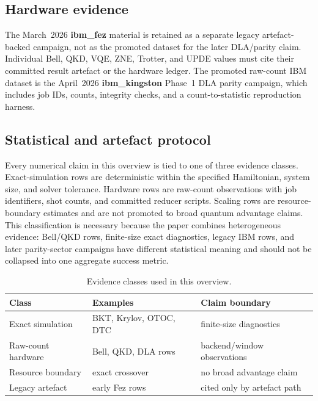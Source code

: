 \documentclass[twocolumn,prl,superscriptaddress,showpacs,floatfix]{revtex4-2}
\begin{document}
\subsection{Hardware evidence}

The March~2026 \textbf{ibm\_fez} material is retained as a separate
legacy artefact-backed campaign, not as the promoted dataset for the later
DLA/parity claim. Individual Bell, QKD, VQE, ZNE, Trotter, and UPDE
values must cite their committed result artefact or the hardware ledger. The
promoted raw-count IBM dataset is the April~2026 \textbf{ibm\_kingston}
Phase~1 DLA parity campaign, which includes job IDs, counts, integrity checks,
and a count-to-statistic reproduction harness.

\subsection{Statistical and artefact protocol}

Every numerical claim in this overview is tied to one of three evidence
classes. Exact-simulation rows are deterministic within the specified
Hamiltonian, system size, and solver tolerance. Hardware rows are raw-count
observations with job identifiers, shot counts, and committed reducer scripts.
Scaling rows are resource-boundary estimates and are not promoted to broad
quantum advantage claims. This classification is necessary because the paper
combines heterogeneous evidence: Bell/QKD rows, finite-size exact diagnostics,
legacy IBM rows, and later parity-sector campaigns have different statistical
meaning and should not be collapsed into one aggregate success metric.

\begin{table}[b]
\caption{\label{tab:evidenceclasses}%
Evidence classes used in this overview.}
\footnotesize
\begin{tabular}{@{}p{}p{}p{}@{}}
\toprule
Class & Examples & Claim boundary \\
\midrule
Exact simulation & BKT, Krylov, OTOC, DTC & finite-size diagnostics \\
Raw-count hardware & Bell, QKD, DLA rows & backend/window observations \\
Resource boundary & exact crossover & no broad advantage claim \\
Legacy artefact & early Fez rows & cited only by artefact path \\
\bottomrule
\end{tabular}
\end{table}
\end{document}
